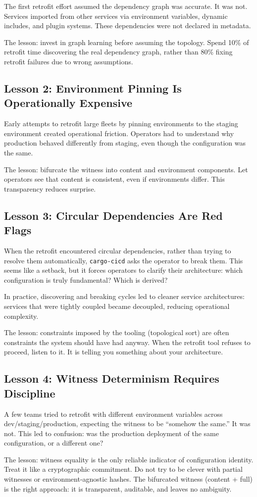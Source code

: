 The first retrofit effort assumed the dependency graph was accurate. It was not. Services imported from other services via environment variables, dynamic includes, and plugin systems. These dependencies were not declared in metadata.

The lesson: invest in graph learning before assuming the topology. Spend 10\% of retrofit time discovering the real dependency graph, rather than 80\% fixing retrofit failures due to wrong assumptions.

\subsection{Lesson 2: Environment Pinning Is Operationally Expensive}

Early attempts to retrofit large fleets by pinning environments to the staging environment created operational friction. Operators had to understand why production behaved differently from staging, even though the configuration was the same.

The lesson: bifurcate the witness into content and environment components. Let operators see that content is consistent, even if environments differ. This transparency reduces surprise.

\subsection{Lesson 3: Circular Dependencies Are Red Flags}

When the retrofit encountered circular dependencies, rather than trying to resolve them automatically, \texttt{cargo-cicd} asks the operator to break them. This seems like a setback, but it forces operators to clarify their architecture: which configuration is truly fundamental? Which is derived?

In practice, discovering and breaking cycles led to cleaner service architectures: services that were tightly coupled became decoupled, reducing operational complexity.

The lesson: constraints imposed by the tooling (topological sort) are often constraints the system should have had anyway. When the retrofit tool refuses to proceed, listen to it. It is telling you something about your architecture.

\subsection{Lesson 4: Witness Determinism Requires Discipline}

A few teams tried to retrofit with different environment variables across dev/staging/production, expecting the witness to be ``somehow the same.'' It was not. This led to confusion: was the production deployment of the same configuration, or a different one?

The lesson: witness equality is the only reliable indicator of configuration identity. Treat it like a cryptographic commitment. Do not try to be clever with partial witnesses or environment-agnostic hashes. The bifurcated witness (content + full) is the right approach: it is transparent, auditable, and leaves no ambiguity.
